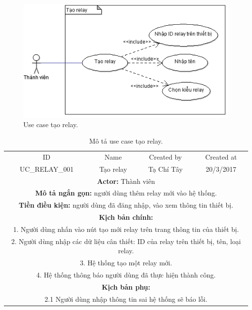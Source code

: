 \documentclass[a4paper,12pt,oneside]{article}
\begin{document}
\begin{figure}[H]
	\centering
	\includegraphics[scale=1]{hinh/addrelay.png}
	\caption{Use case tạo relay.}
\end{figure}

\begin{table}[!htp]
\centering
\begin{tabularx}{\linewidth}{ |c||c|c|c| }
\hline
ID & Name & Created by & Created at\\
UC\_RELAY\_001 & Tạo relay & Tạ Chí Tây & 20/3/2017\\
\hline
\multicolumn{4}{|X|}{\textbf{Actor:} Thành viên }\\
\hline
\multicolumn{4}{|X|}{\textbf{Mô tả ngắn gọn:} người dùng thêm relay mới vào hệ thống. }\\
\hline
\multicolumn{4}{|X|}{\textbf{Tiền điều kiện:} người dùng đã đăng nhập, vào xem thông tin thiết bị.}\\
\hline
\multicolumn{4}{|X|}{\textbf{Kịch bản chính:}}\\
\multicolumn{4}{|X|}{1.	Người dùng nhấn vào nút tạo mới relay trên trang thông tin của thiết bị.}\\
\multicolumn{4}{|X|}{ 
2.	Người dùng nhập các dữ liệu cân thiết: ID của relay trên thiết bị, tên, loại relay.}\\
\multicolumn{4}{|X|}{
3.	Hệ thống tạo một relay mới.}\\

\multicolumn{4}{|X|}{4. Hệ thống thông báo người dùng đã thực hiện thành công.}\\
\hline
\multicolumn{4}{|X|}{\textbf{Kịch bản phụ:}}\\
\multicolumn{4}{|X|}{2.1    Người dùng nhập thông tin sai hệ thống sẽ báo lỗi.}\\
\hline

\end{tabularx}
\caption{Mô tả use case tạo relay.}
\end{table}
\end{document}
